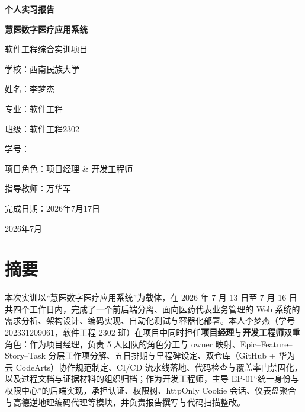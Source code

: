 \documentclass[UTF8,a4paper,12pt,openany,fontset=windows]{ctexrep}
\begin{document}
\songti{}
\hypersetup{pageanchor=false}

\begin{titlepage}
  \thispagestyle{empty}
  \begin{center}
    \vspace*{0.8cm}
    {\heiti{}\bfseries 个人实习报告\par}
    \vspace{1.6cm}
    {\heiti{}\bfseries 慧医数字医疗应用系统\par}
    \vspace{0.6cm}
    {\songti{}软件工程综合实训项目\par}
    \vfill
    \begin{minipage}{0.78\textwidth}
      \noindent\heiti 学\quad 校：\songti 西南民族大学\par\vspace{0.55em}
      \noindent\heiti 姓\quad 名：\songti 李梦杰\par\vspace{0.55em}
      \noindent\heiti 专\quad 业：\songti 软件工程\par\vspace{0.55em}
      \noindent\heiti 班\quad 级：\songti 软件工程2302\par\vspace{0.55em}
      \noindent\heiti 学\quad 号：\par\vspace{0.55em}
      \noindent\heiti 项目角色：\songti 项目经理 \& 开发工程师\par\vspace{0.55em}
      \noindent\heiti 指导教师：\songti 万华军\par\vspace{0.55em}
      \noindent\heiti 完成日期：\songti 2026年7月17日\par
    \end{minipage}
    \vfill
    {\songti{}2026年7月\par}
  \end{center}
\end{titlepage}

\hypersetup{pageanchor=true}

\chapter*{摘\quad 要}
本次实训以“慧医数字医疗应用系统”为载体，在 2026 年 7 月 13 日至 7 月 16 日共四个工作日内，完成了一个前后端分离、面向医药代表业务管理的 Web 系统的需求分析、架构设计、编码实现、自动化测试与容器化部署。本人李梦杰（学号 202331209061，软件工程 2302 班）在项目中同时担任\textbf{项目经理}与\textbf{开发工程师}双重角色：作为项目经理，负责 5 人团队的角色分工与 owner 映射、Epic--Feature--Story--Task 分层工作项分解、五日排期与里程碑设定、双仓库（GitHub + 华为云 CodeArts）协作规范制定、CI/CD 流水线落地、代码检查与覆盖率门禁固化，以及过程文档与证据材料的组织归档；作为开发工程师，主导 EP-01“统一身份与权限中心”的后端实现，承担认证、权限树、httpOnly Cookie 会话、仪表盘聚合与高德逆地理编码代理等模块，并负责报告撰写与代码扫描整改。
\end{document}
